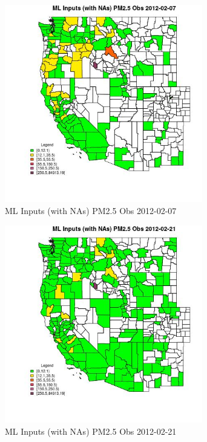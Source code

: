 
\clearpage 

\begin{figure} 
\centering  
\includegraphics[width=0.77\textwidth]{Code_Outputs/Report_ML_input_PM25_Step4_part_f_de_duplicated_aves_prioritize_24hr_obswNAs_CountyPM25_ObsMean2012-02-07.jpg} 
\caption{\label{fig:Report_ML_input_PM25_Step4_part_f_de_duplicated_aves_prioritize_24hr_obswNAsCountyPM25_ObsMean2012-02-07}ML Inputs (with NAs) PM2.5 Obs 2012-02-07} 
\end{figure} 
 

\begin{figure} 
\centering  
\includegraphics[width=0.77\textwidth]{Code_Outputs/Report_ML_input_PM25_Step4_part_f_de_duplicated_aves_prioritize_24hr_obswNAs_CountyPM25_ObsMean2012-02-21.jpg} 
\caption{\label{fig:Report_ML_input_PM25_Step4_part_f_de_duplicated_aves_prioritize_24hr_obswNAsCountyPM25_ObsMean2012-02-21}ML Inputs (with NAs) PM2.5 Obs 2012-02-21} 
\end{figure} 
 

